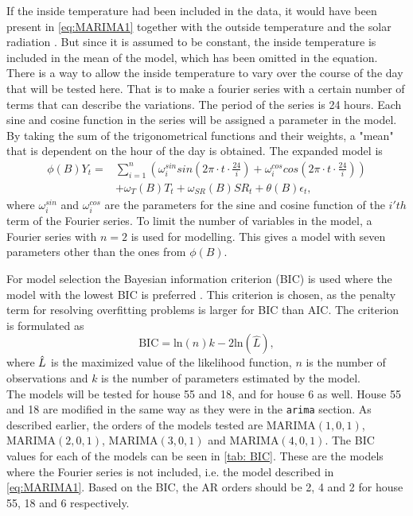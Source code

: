 \noindent If the inside temperature had been included in the data, it would have been present in \cref{eq:MARIMA1} together with the outside temperature and the solar radiation \cite{peder}. But since it is assumed to be constant, the inside temperature is included in the mean of the model, which has been omitted in the equation. There is a way to allow the inside temperature to vary over the course of the day that will be tested here. That is to make a fourier series with a certain number of terms that can describe the variations. The period of the series is 24 hours. Each sine and cosine function in the series will be assigned a parameter in the model. By taking the sum of the trigonometrical functions and their weights, a "mean" that is dependent on the hour of the day is obtained. The expanded model is
\begin{align}
    \phi (B) Y_t = &\sum_{i=1}^n \left(\omega^{sin}_i sin\left(2\pi\cdot t \cdot \frac{24}{i}\right) + \omega^{cos}_i cos\left(2\pi\cdot t \cdot \frac{24}{i}\right)\right) \nonumber\\ & + \omega_{T}(B)T_t + \omega_{SR}(B)SR_t + \theta (B) \epsilon_t ,
    \label{eq:MARIMA2}
\end{align}
where $\omega^{sin}_i$ and $\omega^{cos}_i$ are the parameters for the sine and cosine function of the $i'th$ term of the Fourier series. To limit the number of variables in the model, a Fourier series with $n=2$ is used for modelling. This gives a model with seven parameters other than the ones from $\phi(B)$.



\noindent For model selection the Bayesian information criterion (BIC) is used where the model with the lowest BIC is preferred \cite{BIC}. This criterion is chosen, as the penalty term for resolving overfitting problems is larger for BIC than AIC. The criterion is formulated as
\begin{equation}
    \text{BIC} = \text{ln}(n)k - 2\text{ln}(\widehat{L}),
\end{equation}
where $\Hat{L}$ is the maximized value of the likelihood function, $n$ is the number of observations and $k$ is the number of parameters estimated by the model. \\

\noindent The models will be tested for house 55 and 18, and for house 6 as well. House 55 and 18 are modified in the same way as they were in the \texttt{arima} section. As described earlier, the orders of the models tested are MARIMA$(1,0,1)$, MARIMA$(2,0,1)$, MARIMA$(3,0,1)$ and MARIMA$(4,0,1)$. The BIC values for each of the models can be seen in \cref{tab: BIC}. These are the models where the Fourier series is not included, i.e. the model described in \cref{eq:MARIMA1}. Based on the BIC, the AR orders should be 2, 4 and 2 for house 55, 18 and 6 respectively.

